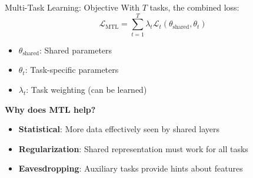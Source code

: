 \documentclass[11pt]{beamer}
\begin{document}
\begin{frame}{Multi-Task Learning: Objective}
    With $T$ tasks, the combined loss:
    \[
        \mathcal{L}_{\text{MTL}} = \sum_{t=1}^{T} \lambda_t \mathcal{L}_t(\theta_{\text{shared}}, \theta_t)
    \]
    \begin{itemize}
        \item $\theta_{\text{shared}}$: Shared parameters
        \item $\theta_t$: Task-specific parameters
        \item $\lambda_t$: Task weighting (can be learned)
    \end{itemize}
    \vspace{0.5em}
    \textbf{Why does MTL help?}
    \begin{itemize}
        \item \textbf{Statistical}: More data effectively seen by shared layers
        \item \textbf{Regularization}: Shared representation must work for all tasks
        \item \textbf{Eavesdropping}: Auxiliary tasks provide hints about features
    \end{itemize}
\end{frame}
\end{document}
